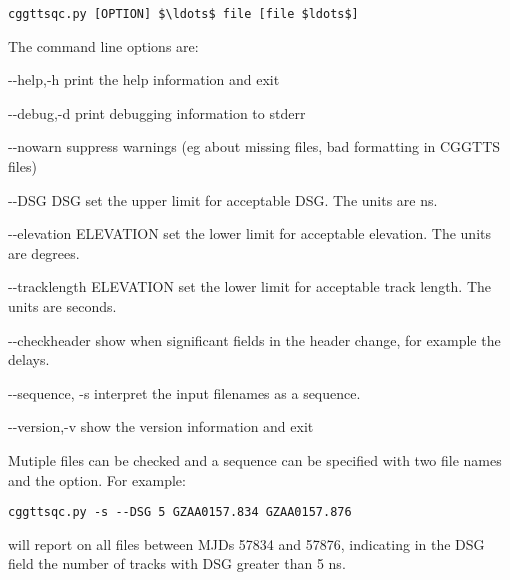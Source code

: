 \begin{lstlisting}[mathescape=true]
cggttsqc.py [OPTION] $\ldots$ file [file $ldots$]
\end{lstlisting}
The command line options are:
\begin{description*}
	\item[-{}-help,-h]	print the help information and exit
	\item[-{}-debug,-d]	print debugging information to stderr
	\item[-{}-nowarn]   suppress warnings (eg about missing files, bad formatting in CGGTTS files)
	\item[-{}-DSG DSG]  set the upper limit for acceptable DSG. The units are ns.
	\item[-{}-elevation ELEVATION] set the lower limit for acceptable elevation. The units are degrees.
	\item[-{}-tracklength  ELEVATION] set the lower limit for acceptable track length. The units are seconds.
	\item[-{}-checkheader] show when significant fields in the header change, for example the delays.
	\item[-{}-sequence, -s] interpret the input filenames as a sequence.
	\item[-{}-version,-v] show the version information and exit
\end{description*}
Mutiple files can be checked and a sequence can be specified with two file names and the  option.
For example:
\begin{lstlisting}
cggttsqc.py -s --DSG 5 GZAA0157.834 GZAA0157.876
\end{lstlisting}
will report on all files between MJDs 57834 and 57876, indicating in the DSG field the number of tracks with DSG greater
than 5 ns.
